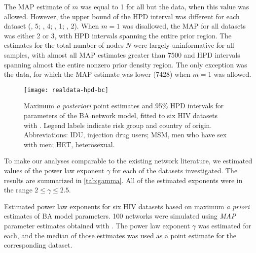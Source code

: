 The MAP estimate of $m$ was equal to 1 for all but the
\citeauthor{novitsky2014impact} data, when this value was allowed. However, the
upper bound of the HPD interval was different for each dataset
  (\citeauthor{niculescu2015recent}, 5;
   \citeauthor{wang2015targeting}, 4;
   \citeauthor{li2015hiv}, 1;
   \citeauthor{cuevas2009hiv}, 2).
When $m = 1$ was disallowed, the MAP for all datasets was either 2 or 3, with
HPD intervals spanning the entire prior region. The estimates for the total
number of nodes $N$ were largely uninformative for all samples, with almost all
MAP estimates greater than 7500 and HPD intervals spanning almost the entire
nonzero prior density region. The only exception was the \citeauthor{li2015hiv}
data, for which the MAP estimate was lower 
  (7428)
when $m = 1$ was allowed.

\begin{figure*}[ht]
  \centering
  \texttt{[image: realdata-hpd-bc]}
  \caption[
      Maximum \textit{a posteriori} point estimates and 95\% HPD intervals for
      parameters of the BA network model, fitted to six HIV datasets
      with .]
  {
      Maximum \textit{a posteriori} point estimates and 95\% HPD intervals for
      parameters of the BA network model, fitted to six HIV datasets with
      . Legend labels indicate risk group and country of
      origin. Abbreviations: IDU, injection drug users; MSM, men who have sex
      with men; HET, heterosexual.
  }
  \label{fig:abchpd}
\end{figure*}

To make our analyses comparable to the existing network literature, we
estimated values of the power law exponent $\gamma$ for each of the datasets 
investigated. The results are summarized in \cref{tab:gamma}. All of the
estimated exponents were in the range $2 \leq \gamma \leq 2.5$. 

\begin{table}
    \centering
    
    \caption[
        Estimated power law exponents for six HIV datasets based on maximum
        \textit{a priori} estimates of BA model parameters.
    ]{
        Estimated power law exponents for six HIV datasets based on maximum
        \textit{a priori} estimates of BA model parameters. 100 networks were
        simulated using \textit{MAP} parameter estimates obtained with
        . The power law exponent $\gamma$ was estimated for
        each, and the median of those estimates was used as a point estimate
        for the corresponding dataset.
    }
    \label{tab:gamma}
\end{table}
